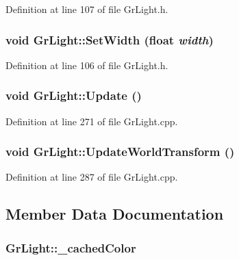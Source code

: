 Definition at line 107 of file GrLight.h.\hypertarget{class_gr_light_e9d277fb571428a9afdcc84e773718e0}{
\subsubsection[{SetWidth}]{\setlength{\rightskip}{0pt plus 5cm}void GrLight::SetWidth (float {\em width})}}
\label{class_gr_light_e9d277fb571428a9afdcc84e773718e0}




Definition at line 106 of file GrLight.h.\hypertarget{class_gr_light_f7fafb95d904499e073a94783b624bf9}{
\subsubsection[{Update}]{\setlength{\rightskip}{0pt plus 5cm}void GrLight::Update ()}}
\label{class_gr_light_f7fafb95d904499e073a94783b624bf9}




Definition at line 271 of file GrLight.cpp.\hypertarget{class_gr_light_97c448c6a785fd77ba475f5a0f4a2c5f}{
\subsubsection[{UpdateWorldTransform}]{\setlength{\rightskip}{0pt plus 5cm}void GrLight::UpdateWorldTransform ()}}
\label{class_gr_light_97c448c6a785fd77ba475f5a0f4a2c5f}




Definition at line 287 of file GrLight.cpp.

\subsection{Member Data Documentation}
\hypertarget{class_gr_light_6c14df5bd91c6d8928ed198cc11424b5}{
\subsubsection[{\_\-cachedColor}]{ {\bf GrLight::\_\-cachedColor}}}
\label{class_gr_light_6c14df5bd91c6d8928ed198cc11424b5}




